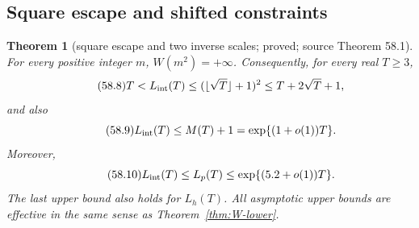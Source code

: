 \documentclass[10pt,reqno]{amsart}
\newtheorem{theorem}{Theorem}[section]
\theoremstyle{definition}
\newcommand{\1}{\mathbf 1}
\begin{document}
\subsection{Square escape and shifted constraints}
\begin{theorem}[square escape and two inverse scales; proved; source
Theorem 58.1]\label{thm:square-escape}
For every positive integer $m$, $W(m^2)=+\infty$.  Consequently, for every
real $T\geq3$,
\begin{equation}\tag{58.8}
 T<L_{\rm int}(T)
 \leq(\lfloor\sqrt T\rfloor+1)^2
 \leq T+2\sqrt T+1,
\end{equation}
and also
\begin{equation}\tag{58.9}
 L_{\rm int}(T)\leq M(T)+1=\exp\{(1+o(1))T\}.
\end{equation}
Moreover,
\begin{equation}\tag{58.10}
 L_{\rm int}(T)\leq L_p(T)
 \leq\exp\{(5.2+o(1))T\}.
\end{equation}
The last upper bound also holds for $L_h(T)$.  All asymptotic upper bounds
are effective in the same sense as Theorem~\ref{thm:W-lower}.
\end{theorem}
\end{document}
